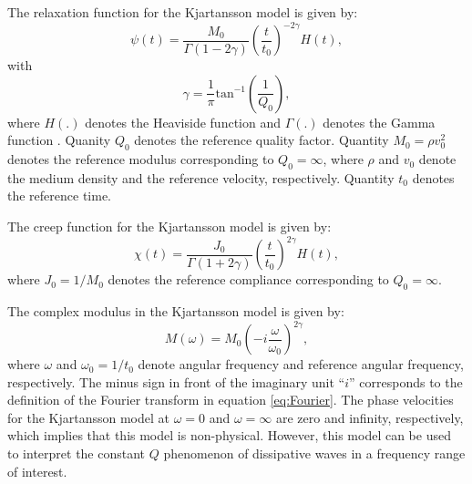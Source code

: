 \documentclass[article]{./macros/elsarticle_qh}
\begin{document}
The relaxation function for the Kjartansson model is given by:
\begin{equation} \label{eq:psi_kjar}
\psi(t) = \frac{M_{0}}{\Gamma (1- 2\gamma)} 
               \left( \frac{t}{t_{0}} \right)^{-2\gamma} H(t) ,
\end{equation}
with
\begin{equation}
\gamma = \frac{1}{\pi} \text{tan}^{-1} \left(\frac{1}{Q_{0}} \right) ,
\end{equation}
where $H(.)$ denotes the Heaviside function and $\Gamma(.)$ denotes the Gamma function \cite[]{arfken:2013}. Quanity $Q_{0}$ denotes the reference quality factor. Quantity $M_{0} = \rho v_{0}^2$ denotes the reference modulus corresponding to $Q_{0} = \infty$, where $\rho$ and $v_{0}$ denote the medium density and the reference velocity, respectively. Quantity $t_{0}$ denotes the reference time.  

The creep function for the Kjartansson model is given by:
\begin{equation} \label{eq:chi_kjar}
\chi(t) = \frac{J_{0}}{\Gamma (1 + 2\gamma)} 
\left( \frac{t}{t_{0}} \right)^{2\gamma} H(t) ,
\end{equation}
where $J_{0} = 1/M_{0}$ denotes the reference compliance corresponding to $Q_{0} = \infty$.

The complex modulus in the Kjartansson model is given by:
\begin{equation} \label{eq:Mkjar}
M(\omega) = M_{0} \left(-i\frac{\omega}{\omega_{0}} \right)^{2\gamma} ,
\end{equation}
where $\omega$ and $\omega_{0}=1/t_{0}$ denote angular frequency and reference angular frequency, respectively. The minus sign in front of the imaginary unit ``$i$'' corresponds to the definition of the Fourier transform in equation \ref{eq:Fourier}. The phase velocities for the Kjartansson model at $\omega=0$ and $\omega=\infty$ are zero and infinity, respectively, which implies that this model is non-physical. However, this model can be used to interpret the constant $Q$ phenomenon of dissipative waves in a frequency range of interest.
\end{document}
